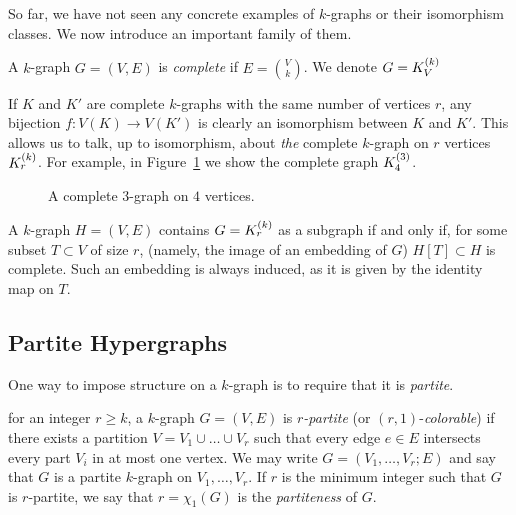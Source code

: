 So far, we have not seen any concrete examples of $k$-graphs or their isomorphism classes.
We now introduce an important family of them.

\begin{definition} \label{def:complete}
    A $k$-graph $G = (V, E)$ is \emph{complete} if $E = \binom{V}{k}$.
    We denote $G = K^{(k)}_{V}$
\end{definition}

If $K$ and $K'$ are complete $k$-graphs with the same number of vertices $r$,
any bijection $f: V(K) \to V(K')$ is clearly an isomorphism between $K$ and $K'$.
This allows us to talk, up to isomorphism, about \emph{the} complete $k$-graph on $r$ vertices $K^{(k)}_{r}$.
For example, in Figure~\ref{fig:complete_kgraph} we show the complete graph $K^{(3)}_{4}$.

\begin{figure}[htbp]
    \centering
    
    \caption{A complete $3$-graph on $4$ vertices.}
    \label{fig:complete_kgraph}
\end{figure}

\begin{remark}
    A $k$-graph $H = (V, E)$ contains $G = K^{(k)}_{r}$ as a subgraph if and only if,
    for some subset $T \subset V$ of size $r$, (namely, the image of an embedding of $G$)
    $H[T] \subset H$ is complete.
    Such an embedding is always induced, as it is given by the identity map on $T$.
\end{remark}

\subsection{Partite Hypergraphs}\label{subsec:partite}

One way to impose structure on a $k$-graph is to require that it is \emph{partite}.

\begin{definition} \label{def:partite} %
    for an integer $r \geq k$, a $k$-graph $G = (V, E)$ is \emph{$r$-partite}
    (or $(r, 1)$-\emph{colorable})
    if there exists a partition $V = V_1 \cup \dots \cup V_r$
    such that every edge $e \in E$ intersects every part $V_i$ in at most one vertex.
    We may write $G = (V_1, \dots, V_r; E)$ and say that
    $G$ is a partite $k$-graph on $V_1, \dots, V_r$.
    If $r$ is the minimum integer such that $G$ is $r$-partite,
    we say that $r = \chi_{1}(G)$ is the \emph{partiteness} of $G$.
\end{definition}

